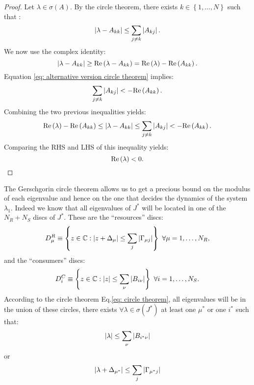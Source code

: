 \documentclass[12pt, titlepage]{report}
\begin{document}
\begin{proof}
Let $\lambda \in \sigma(A)$. By the circle theorem, there exists $k \in \left\{1,\dots, N\right\}$ such that :
\begin{equation}
\left|{\lambda-A_{kk}}\right| \leq \sum_{j\neq k} \left|{A_{kj}}\right|.
\end{equation}
We now use the complex identity:
\begin{equation}
\left|{\lambda-A_{kk}}\right| \geq \text{Re}\left(\lambda-A_{kk}\right) = \text{Re}\left(\lambda\right)-\text{Re}\left(A_{kk}\right).
\end{equation}
Equation \eqref{eq: alternative version circle theorem} implies:
\begin{equation}
\sum_{j\neq k}\left|{A_{kj}}\right| < - \text{Re}\left(A_{kk}\right).
\end{equation}
Combining the two previous inequalities yields:
\begin{equation}
\text{Re}\left(\lambda\right)-\text{Re}\left(A_{kk}\right) \leq \left|{\lambda-A_{kk}}\right| \leq \sum_{j\neq k} \left|{A_{kj}}\right| < -\text{Re}\left(A_{kk}\right).
\end{equation}
Comparing the RHS and LHS of this inequality yields:
\begin{equation}
\text{Re}\left(\lambda\right) < 0.
\end{equation}
\end{proof}
\noindent The Gerschgorin circle theorem allows us to get a precious bound on the modulus of each eigenvalue and hence on the one that decides the dynamics of the system $\lambda_1$. Indeed we know that all eigenvalues of $J^*$ will be located in one of the $N_R + N_S$ discs of $J^*$. These are the ``resources'' discs:
\begin{equation}
D^R_\mu  \equiv \left\{ z \in \mathbb{C}: \left|{z+\Delta_\mu}\right| \leq \sum_j \left|{\Gamma_{\mu j}}\right| \right\}  \ \forall \mu = 1, \dots, N_R,
\end{equation}
and the ``consumers'' discs:
\begin{equation}
D^C_i \equiv \left\{ z \in \mathbb{C}: \left|{z}\right| \leq \sum_\nu \left|{B_{i\nu}}\right|\right\} \ \forall i=1, \dots, N_S.
\end{equation}
According to the circle theorem Eq.\eqref{eq: circle theorem}, all eigenvalues will be in the union of these circles, \ie there exists $\forall \lambda \in \sigma\left(J^*\right)$ at least one $\mu^*$ or  one $i^*$ such that:
\begin{equation}
\left|{\lambda}\right| \leq \sum_\nu \left|{B_{i^*\nu}}\right| \label{eq: bound lambda consumers}
\end{equation}
or
\begin{equation}
\left|{\lambda+\Delta_{\mu^*}}\right| \leq \sum_j \left|{\Gamma_{\mu^* j}}\right| \label{eq: bound lambda 1 resources}
\end{equation}
\end{document}
